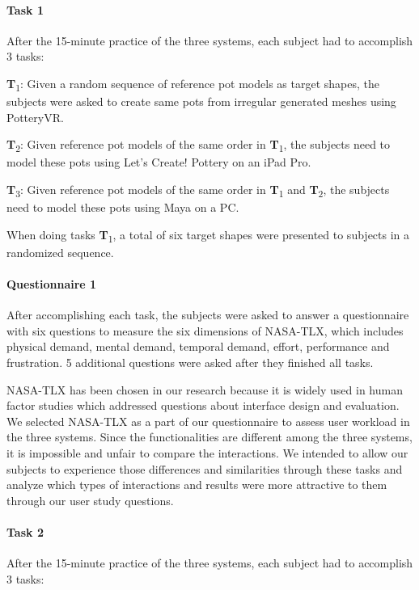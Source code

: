 \documentclass{svjour3}                     %
\begin{document}
\paragraph{Task 1} After the 15-minute practice of the three systems, each subject had to accomplish 3 tasks:

\textbf{T}\textsubscript{1}: Given a random sequence of reference pot models as target shapes, the subjects were asked to create same pots from irregular generated meshes using PotteryVR. 

\textbf{T}\textsubscript{2}: Given reference pot models of the same order in \textbf{T}\textsubscript{1}, the subjects need to model these pots using Let's Create! Pottery on an iPad Pro.

\textbf{T}\textsubscript{3}: Given reference pot models of the same order in \textbf{T}\textsubscript{1} and \textbf{T}\textsubscript{2}, the subjects need to model these pots using Maya on a PC.


When doing tasks \textbf{T}\textsubscript{1}, a total of six target shapes were presented to subjects in a randomized sequence.

\paragraph{Questionnaire 1} After accomplishing each task, the subjects were asked to answer a questionnaire with six questions to measure the six dimensions of NASA-TLX, which includes physical demand, mental demand, temporal demand, effort, performance and frustration. 5 additional questions were asked after they finished all tasks.

NASA-TLX has been chosen in our research because it is widely used in human factor studies which addressed questions about interface design and evaluation.\cite{hart2006nasa} We selected NASA-TLX as a part of our questionnaire to assess user workload in the three systems. Since the functionalities are different among the three systems, it is impossible and unfair to compare the interactions. We intended to allow our subjects to experience those differences and similarities through these tasks and analyze which types of interactions and results were more attractive to them through our user study questions.

\paragraph{Task 2} After the 15-minute practice of the three systems, each subject had to accomplish 3 tasks:
\end{document}

